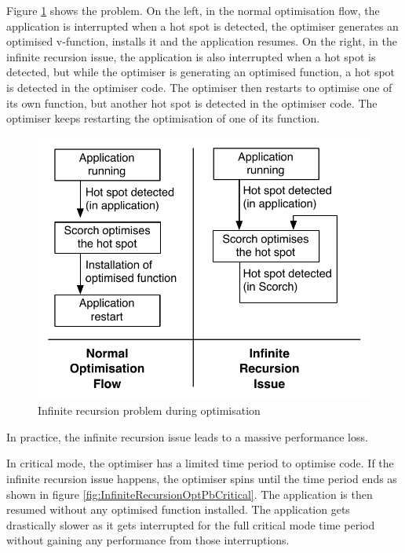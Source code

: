 \documentclass[a4paper,12pt,twoside]{../includes/ThesisStyle}
\begin{document}
Figure \ref{fig:InfiniteRecursionOptPb} shows the problem. On the left, in the normal optimisation flow, the application is interrupted when a hot spot is detected, the optimiser generates an optimised v-function, installs it and the application resumes. On the right, in the infinite recursion issue, the application is also interrupted when a hot spot is detected, but while the optimiser is generating an optimised function, a hot spot is detected in the optimiser code. The optimiser then restarts to optimise one of its own function, but another hot spot is detected in the optimiser code. The optimiser keeps restarting the optimisation of one of its function.

\begin{figure}[h!]
    \begin{center}
        \includegraphics[width=0.65\linewidth]{InfiniteRecursionOptPb}
        \caption{Infinite recursion problem during optimisation}
        \label{fig:InfiniteRecursionOptPb}
    \end{center}
\end{figure}

In practice, the infinite recursion issue leads to a massive performance loss.

In critical mode, the optimiser has a limited time period to optimise code. If the infinite recursion issue happens, the optimiser spins until the time period ends as shown in figure \ref{fig:InfiniteRecursionOptPbCritical}. The application is then resumed without any optimised function installed. The application gets drastically slower as it gets interrupted for the full critical mode time period without gaining any performance from those interruptions.
\end{document}
